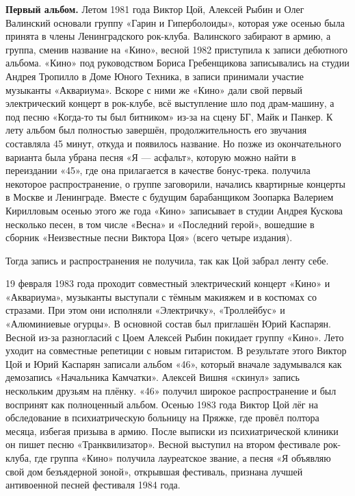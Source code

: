 \textbf{Первый альбом.}
Летом 1981 года Виктор Цой, Алексей Рыбин и Олег Валинский основали группу «Гарин и Гиперболоиды», которая уже осенью была принята в члены Ленинградского рок-клуба.  Валинского забирают в армию, а группа, сменив название на «Кино», весной 1982 приступила к записи дебютного альбома. «Кино» под руководством Бориса Гребенщикова записывались на студии Андрея Тропилло в Доме Юного Техника, в записи принимали участие музыканты «Аквариума». Вскоре с ними же «Кино» дали свой первый электрический концерт в рок-клубе, всё выступление шло под драм-машину, а под песню «Когда-то ты был битником» из-за  на сцену  БГ, Майк и Панкер. К лету альбом был полностью завершён, продолжительность его звучания составляла 45 минут, откуда и появилось название. Но позже из окончательного варианта была убрана песня «Я --- асфальт», которую можно найти в переиздании «45», где она прилагается в качестве бонус-трека.  получила некоторое распространение, о группе заговорили, начались квартирные концерты в Москве и Ленинграде. Вместе с будущим барабанщиком Зоопарка Валерием Кирилловым осенью этого же года «Кино» записывает в студии Андрея Кускова несколько песен, в том числе «Весна» и «Последний герой», вошедшие в сборник «Неизвестные песни Виктора Цоя» (всего четыре издания).

Тогда запись  и распространения не получила, так как Цой забрал ленту себе.

19 февраля 1983 года проходит совместный электрический концерт «Кино» и «Аквариума», музыканты выступали с тёмным макияжем и в костюмах со стразами. При этом они исполняли «Электричку», «Троллейбус» и «Алюминиевые огурцы». В основной состав был приглашён Юрий Каспарян. Весной из-за разногласий с Цоем Алексей Рыбин покидает группу «Кино». Лето уходит на совместные репетиции с новым гитаристом. В результате этого Виктор Цой и Юрий Каспарян записали альбом «46», который вначале задумывался как демозапись «Начальника Камчатки». Алексей Вишня «скинул» запись нескольким друзьям на плёнку. «46» получил широкое распространение и был воспринят как полноценный альбом. Осенью 1983 года Виктор Цой лёг на обследование в психиатрическую больницу на Пряжке, где провёл полтора месяца, избегая призыва в армию. После выписки из психиатрической клиники он пишет песню «Транквилизатор». Весной выступил на втором фестивале рок-клуба, где группа «Кино» получила лауреатское звание, а песня «Я объявляю свой дом безъядерной зоной», открывшая фестиваль, признана лучшей антивоенной песней фестиваля 1984 года.




